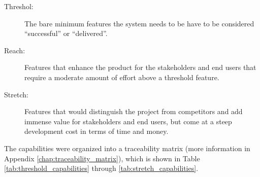 {
\renewcommand{\descriptionlabel}[1]{\hspace{\labelsep}\textbf{#1}}
\begin{description}
    \item[Threshol:] The bare minimum features the system needs to be have to be considered ``successful'' or ``delivered''.
    
    \item[Reach:] Features that enhance the product for the stakeholders and end users that require a moderate amount of effort above a threshold feature.						
    
    \item[Stretch:] Features that would distinguish the project from competitors and add immense value for stakeholders and end users, but come at a steep development cost in terms of time and money.
\end{description}
}

The capabilities were organized into a traceability matrix (more information in Appendix \ref{chap:traceability_matrix}), which is shown in Table \ref{tab:threshold_capabilities} through \ref{tab:stretch_capabilities}.

% 



